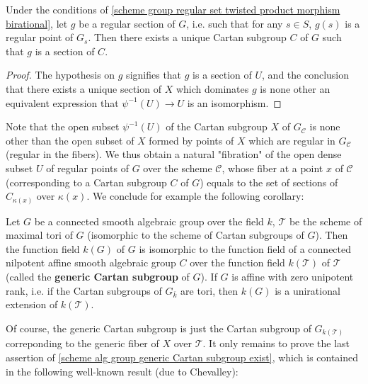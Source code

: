 \begin{corollary}\label{scheme group regular section contained in unique Cartan subgroup}
Under the conditions of \cref{scheme group regular set twisted product morphism birational}, let $g$ be a regular section of $G$, i.e. such that for any $s\in S$, $g(s)$ is a regular point of $G_s$. Then there exists a unique Cartan subgroup $C$ of $G$ such that $g$ is a section of $C$.
\end{corollary}
\begin{proof}
The hypothesis on $g$ signifies that $g$ is a section of $U$, and the conclusion that there exists a unique section of $X$ which dominates $g$ is none other an equivalent expression that $\psi^{-1}(U)\to U$ is an isomorphism.
\end{proof}

Note that the open subset $\psi^{-1}(U)$ of the Cartan subgroup $X$ of $G_\mathscr{C}$ is none other than the open subset of $X$ formed by points of $X$ which are regular in $G_\mathscr{C}$ (regular in the fibers). We thus obtain a natural "fibration" of the open dense subset $U$ of regular points of $G$ over the scheme $\mathscr{C}$, whose fiber at a point $x$ of $\mathscr{C}$ (corresponding to a Cartan subgroup $C$ of $G$) equals to the set of sections of $C_{\kappa(x)}$ over $\kappa(x)$. We conclude for example the following corollary:

\begin{corollary}\label{scheme alg group generic Cartan subgroup exist}
Let $G$ be a connected smooth algebraic group over the field $k$, $\mathscr{T}$ be the scheme of maximal tori of $G$ (isomorphic to the scheme of Cartan subgroups of $G$). Then the function field $k(G)$ of $G$ is isomorphic to the function field of a connected nilpotent affine smooth algebraic group $C$ over the function field $k(\mathscr{T})$ of $\mathscr{T}$ (called the \textbf{generic Cartan subgroup} of $G$). If $G$ is affine with zero unipotent rank, i.e. if the Cartan subgroups of $G_{\bar{k}}$ are tori, then $k(G)$ is a unirational extension of $k(\mathscr{T})$. 
\end{corollary} 

Of course, the generic Cartan subgroup is just the Cartan subgroup of $G_{k(\mathscr{T})}$ correponding to the generic fiber of $X$ over $\mathscr{T}$. It only remains to prove the last assertion of \cref{scheme alg group generic Cartan subgroup exist}, which is contained in the following well-known result (due to Chevalley):

